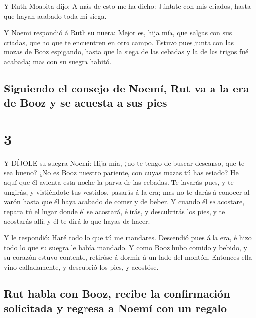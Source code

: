  Y Ruth Moabita dijo: A más de esto me ha dicho: Júntate
con mis criados, hasta que hayan acabado toda mi siega.

 Y Noemi respondió á Ruth su nuera: Mejor es, hija mía, que
salgas con sus criadas, que no que te encuentren en otro campo.
 Estuvo pues junta con las mozas de Booz espigando, hasta
que la siega de las cebadas y la de los trigos fué acabada; mas con su
suegra habitó.

\hypertarget{siguiendo-el-consejo-de-noemuxed-rut-va-a-la-era-de-booz-y-se-acuesta-a-sus-pies}{%
\subsection{Siguiendo el consejo de Noemí, Rut va a la era de Booz y se
acuesta a sus
pies}\label{siguiendo-el-consejo-de-noemuxed-rut-va-a-la-era-de-booz-y-se-acuesta-a-sus-pies}}

\hypertarget{section-2}{%
\section{3}\label{section-2}}

 Y DÍJOLE su suegra Noemi: Hija mía, ¿no te tengo de buscar
descanso, que te sea bueno?  ¿No es Booz nuestro pariente,
con cuyas mozas tú has estado? He aquí que él avienta esta noche la
parva de las cebadas.  Te lavarás pues, y te ungirás, y
vistiéndote tus vestidos, pasarás á la era; mas no te darás á conocer al
varón hasta que él haya acabado de comer y de beber.  Y
cuando él se acostare, repara tú el lugar donde él se acostará, é irás,
y descubrirás los pies, y te acostarás allí; y él te dirá lo que hayas
de hacer.

 Y le respondió: Haré todo lo que tú me mandares.
 Descendió pues á la era, é hizo todo lo que su suegra le
había mandado.  Y como Booz hubo comido y bebido, y su
corazón estuvo contento, retiróse á dormir á un lado del montón.
Entonces ella vino calladamente, y descubrió los pies, y acostóse.

\hypertarget{rut-habla-con-booz-recibe-la-confirmaciuxf3n-solicitada-y-regresa-a-noemuxed-con-un-regalo}{%
\subsection{Rut habla con Booz, recibe la confirmación solicitada y
regresa a Noemí con un
regalo}\label{rut-habla-con-booz-recibe-la-confirmaciuxf3n-solicitada-y-regresa-a-noemuxed-con-un-regalo}}

